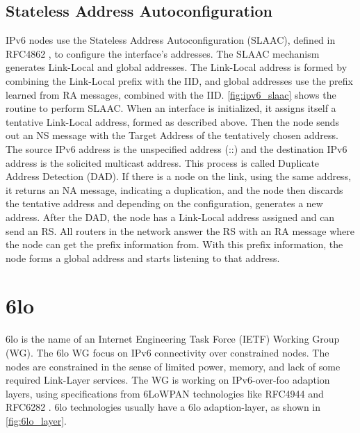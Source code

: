 \subsection{Stateless Address Autoconfiguration}
\label{sec:ipv6_slaac}



IPv6 nodes use the Stateless Address Autoconfiguration (SLAAC), defined in RFC4862 \cite{rfc4862}, to configure  the interface's addresses.
The SLAAC mechanism generates Link-Local and global addresses.
The Link-Local address is formed by combining the Link-Local prefix with the IID, and global addresses use the prefix
learned from RA messages, combined with the IID.
\autoref{fig:ipv6_slaac} shows the routine to perform SLAAC.
When an interface is initialized, it assigns itself a tentative Link-Local address, formed as described above.
Then the node sends out an NS message with the Target Address of the tentatively chosen address.
The source IPv6 address is the unspecified address (::) and the destination IPv6 address is the solicited multicast address.
This process is called Duplicate Address Detection (DAD).
If there is a node on the link, using the same address, it returns an NA message, indicating a duplication, and the node then discards
the tentative address and depending on the configuration, generates a new address.
After the DAD, the node has a Link-Local address assigned and can send an RS.
All routers in the network answer the RS with an RA message where the node can get the prefix information from.
With this prefix information, the node forms a global address and starts listening to that address.

\FloatBarrier

\section{6lo}
\label{sec:6lo}



6lo is the name of an Internet Engineering Task Force (IETF) Working Group (WG).
The 6lo WG focus on IPv6 connectivity over constrained nodes.
The nodes are constrained in the sense of limited power, memory, and lack of some required Link-Layer services.
The WG is working on IPv6-over-foo adaption layers, using specifications from 6LoWPAN technologies like RFC4944 \cite{rfc4944} and RFC6282 \cite{rfc6282}.
6lo technologies usually have a 6lo adaption-layer, as shown in \autoref{fig:6lo_layer}.


